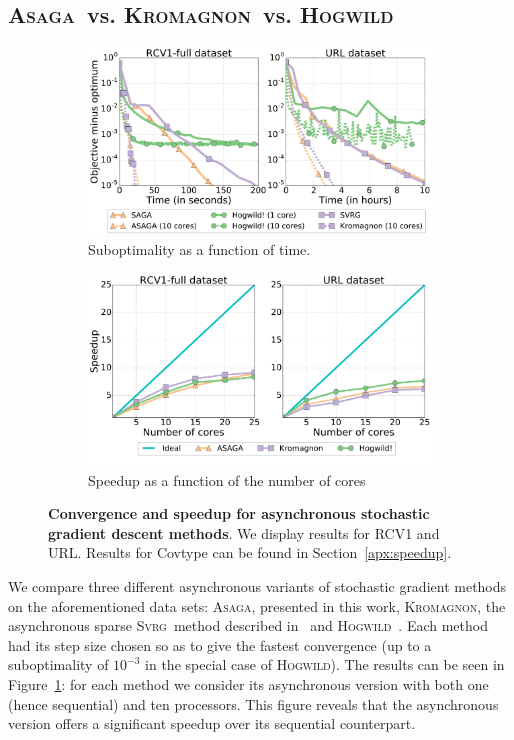 \documentclass[twoside, 11pt]{article}
\newcommand{\ASAGA}{\textsc{Asaga}}
\newcommand{\SVRG}{\textsc{Svrg}}
\newcommand{\Hogwild}{\textsc{Hogwild}}
\newcommand{\KROMAGNON}{\textsc{Kromagnon}}
\begin{document}
\subsection{\ASAGA\ vs. \KROMAGNON\ vs. \Hogwild}\label{sec:asynccomp}
\begin{figure}[ttt!]
	\centering
	\begin{subfigure}[t]{0.48\linewidth}
		\centering
		\includegraphics[width = 1.05\linewidth]{figures/figure_2.pdf}
		\caption{Suboptimality as a function of time.}
		\label{fig:fig_2}
	\end{subfigure}
	\hfill
	\begin{subfigure}[t]{0.48\linewidth}
		\centering
		\includegraphics[width = 1\linewidth]{figures/figure_3.pdf}
		\caption{Speedup as a function of the number of cores}
		\label{fig:fig_3}
	\end{subfigure}
	\caption{ {\bf Convergence and speedup for asynchronous stochastic gradient descent methods}.
		We display results for RCV1 and URL. Results for Covtype can be found in Section~\ref{apx:speedup}. }
\end{figure}
We compare three different asynchronous variants of stochastic gradient methods on the aforementioned data sets: \ASAGA, presented in this work, \KROMAGNON, the asynchronous sparse \SVRG\ method described in~\citet{mania} and \Hogwild~\citep{hogwild}.
Each method had its step size chosen so as to give the fastest convergence (up to a suboptimality of $10^{-3}$ in the special case of \Hogwild).
The results can be seen in Figure~\ref{fig:fig_2}: for each method we consider its asynchronous version with both one (hence sequential) and ten processors.
This figure reveals that the asynchronous version offers a significant speedup over its sequential counterpart.
\end{document}
